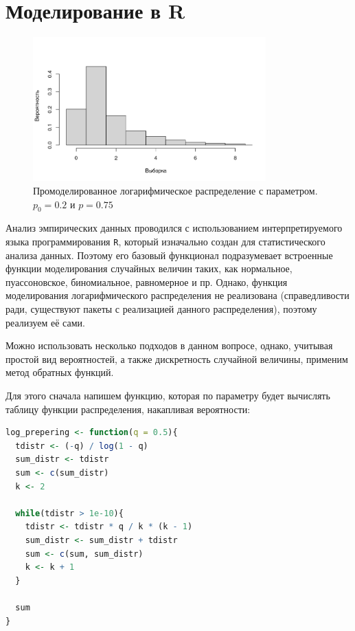 \documentclass[12pt, specialist, subf, substylefile = spbu.rtx]{disser}
\begin{document}
	\section{Моделирование в R}
	
	\begin{figure}[ht]
		\centering
		\includegraphics[width = 0.8\textwidth]{logdistr}
		\caption{Промоделированное логарифмическое распределение с параметром. $ p _0 = 0.2 $ и $ p = 0.75 $}
		\label{img:logdist}
	\end{figure}
	
	Анализ эмпирических данных проводился с использованием интерпретируемого языка программирования \verb|R|, который изначально создан для статистического анализа данных. Поэтому его базовый функционал подразумевает встроенные функции моделирования случайных величин таких, как нормальное, пуассоновское, биномиальное, равномерное и пр. Однако, функция моделирования логарифмического распределения не реализована (справедливости ради, существуют пакеты с реализацией данного распределения), поэтому реализуем её сами.
	
	Можно использовать несколько подходов в данном вопросе, однако, учитывая простой вид вероятностей, а также дискретность случайной величины, применим метод обратных функций.
	
	Для этого сначала напишем функцию, которая по параметру будет вычислять таблицу функции распределения, накапливая вероятности:  
	
	\begin{lstlisting}[language=R]
log_prepering <- function(q = 0.5){
  tdistr <- (-q) / log(1 - q)
  sum_distr <- tdistr
  sum <- c(sum_distr)
  k <- 2
	
  while(tdistr > 1e-10){
    tdistr <- tdistr * q / k * (k - 1)
    sum_distr <- sum_distr + tdistr
    sum <- c(sum, sum_distr)
    k <- k + 1
  }
	
  sum
}
	\end{lstlisting}
	
\end{document}
